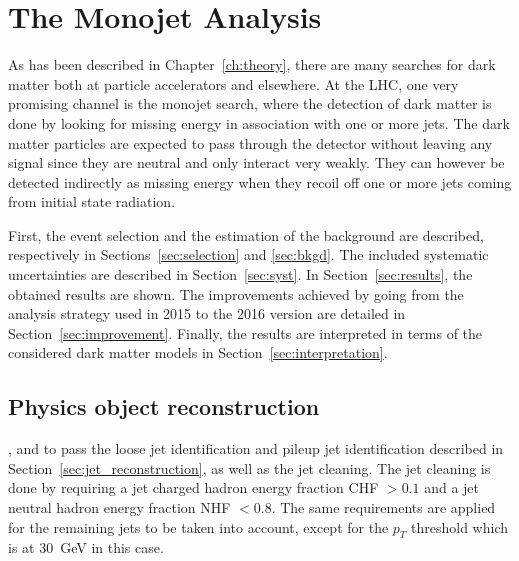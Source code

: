 \graphicspath{{chapt_dutch/}{intro/}{monojet/}}

\renewcommand\evenpagerightmark{{\scshape\small Chapter 5}}
\renewcommand\oddpageleftmark{{\scshape\small The Monojet Analysis}}

\hyphenation{}

\chapter{The Monojet Analysis}
\label{ch:monojet}

As has been described in Chapter~\ref{ch:theory}, there are many searches for dark matter both at 
particle accelerators and elsewhere. At the \ac{LHC}, one very promising channel is the 
monojet search, where the detection of dark matter is done by looking for missing energy in association 
with one or more jets. The dark matter particles are expected to pass through the detector without leaving any signal since they are neutral and only interact very weakly. They can however be detected indirectly as missing energy when they recoil off one or more jets coming from initial state radiation.

First, the event selection and the estimation of the background are described, respectively in Sections~\ref{sec:selection} and \ref{sec:bkgd}. The included systematic uncertainties are described in Section~\ref{sec:syst}. In Section~\ref{sec:results}, the obtained results are shown. The improvements achieved by going from the analysis strategy used in 2015 to the 2016 version are detailed in Section~\ref{sec:improvement}. Finally, the results are interpreted in terms of the considered dark matter models in Section~\ref{sec:interpretation}.


\section{Physics object reconstruction}

, and to pass the loose jet identification and pileup jet identification described in Section~\ref{sec:jet_reconstruction}, as well as the jet cleaning.  The jet cleaning is done by requiring a jet charged hadron energy fraction CHF $> 0.1$ and a jet neutral hadron energy fraction NHF $< 0.8$. The same requirements are applied for the remaining jets to be taken into account, except for the $p_T$ threshold which is at 30~GeV in this case.

